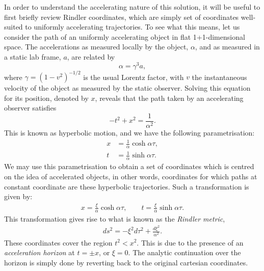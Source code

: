 \documentclass[
twoside,
openright,
frontopenright,
]{dmathesis}
\newcommand{\nn}{\nonumber}
\begin{document}
In order to understand the accelerating nature of this solution, it will be
useful to first briefly review Rindler coordinates, which are simply set of
coordinates well-suited to uniformly accelerating trajectories. To see what this
means, let us consider the path of an uniformly accelerating object in flat
1+1-dimensional space. The accelerations as measured locally by the object,
$\alpha$, and as measured in a static lab frame, $a$, are related by
\begin{equation}
  \alpha = \gamma^3a,
\end{equation}
where $\gamma = (1-v^2)^{-1/2}$ is the usual Lorentz factor, with $v$ the
instantaneous velocity of the object as measured by the static observer. Solving
this equation for its position, denoted by $x$, reveals that the path taken by
an accelerating observer satisfies
\begin{equation}
  -t^2+x^2=\frac{1}{\alpha^2}.
\end{equation}
This is known as hyperbolic motion, and we have the following parametrisation:
\begin{align}
  \label{eq:trajectory}
  x &= \frac{1}{\alpha} \cosh \alpha \tau,\nn\\
  t &= \frac{1}{\alpha} \sinh \alpha \tau.
\end{align}
We may use this parametrisation to obtain a set of coordinates which is centred
on the idea of accelerated objects, in other words, coordinates for which paths
at constant coordinate are these hyperbolic trajectories. Such a transformation
is given by:
\begin{align}
  x = \frac{\xi}{\alpha} \cosh \alpha \tau,\qquad t = \frac{\xi}{\alpha} \sinh
  \alpha \tau.
\end{align}
This transformation gives rise to what is known as the \emph{Rindler metric},
\begin{align}
   ds^2 = -\xi^2 d\tau^2 + \frac{d\xi^2}{\alpha^2}.
\end{align}
These coordinates cover the region $t^2<x^2$. This is due to the presence of an
\emph{acceleration horizon} at $t = \pm x$, or $\xi = 0$. The analytic
continuation over the horizon is simply done by reverting back to the original
cartesian coordinates.
\end{document}
